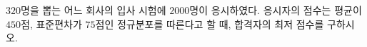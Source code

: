$320$명을 뽑는 어느 회사의 입사 시험에 $2000$명이 응시하였다. 응시자의 점수는 평균이 $450$점, 표준편차가 $75$점인 정규분포를 따른다고 할 때, 합격자의 최저 점수를 구하시오. 

